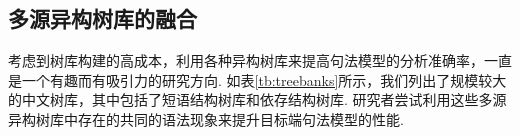 \subsection{多源异构树库的融合}
考虑到树库构建的高成本，利用各种异构树库来提高句法模型的分析准确率，一直是一个有趣而有吸引力的研究方向. 如表\ref{tb:treebanks}所示，我们列出了规模较大的中文树库，其中包括了短语结构树库和依存结构树库. 研究者尝试利用这些多源异构树库中存在的共同的语法现象来提升目标端句法模型的性能.

